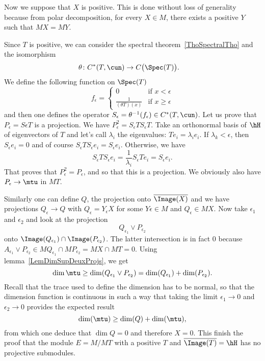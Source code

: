 Now we suppose that $X$ is positive. This is done without loss of generality because from polar decomposition, for every $X\in M$, there exists a positive $Y$ such that $MX=MY$.

Since $T$ is positive, we can consider the spectral theorem~\ref{ThoSpectralTho} and the isomorphism
\begin{equation}
\begin{aligned}
 \theta\colon C^*(T,\cun)&\to C\big( \Spec(T) \big).
\end{aligned}
\end{equation}
We define the following function on $\Spec(T)$
\begin{equation}
	f_{\epsilon}=
			\begin{cases}
					0				&\text{if }x<\epsilon\\
					\frac{ 1 }{ (\theta T)(x) }	&\text{if }x\geq\epsilon
			\end{cases}
\end{equation}
and then one defines the operator $S_{\epsilon}=\theta^{-1}(f_{\epsilon})\in C^*(T,\cun)$. Let us prove that $P_{\epsilon}=S\epsilon T$ is a projection. We have $P_{\epsilon}^2=S_{\epsilon} TS_{\epsilon}T$. Take an orthonormal basis of $\hH$ of eigenvectors of $T$ and let's call $\lambda_i$ the eigenvalues: $Te_i=\lambda_ie_i$. If $\lambda_k<\epsilon$, then $S_{\epsilon}e_i=0$ and of course $S_{\epsilon}TS_{\epsilon}e_i=S_{\epsilon}e_i$. Otherwise, we have
\begin{equation}
	S_{\epsilon}TS_{\epsilon}e_i=\frac{1}{ \lambda_i }S_{\epsilon}T e_i =S_{\epsilon}e_i.
\end{equation}
That proves that $P_{\epsilon}^2=P_{\epsilon}$, and so that this is a projection. We obviously also have $P_{\epsilon}\to \mtu$ in $MT$.

Similarly one can define $Q$, the projection onto $\overline{ \Image(X) }$ and we have projections $Q_{\epsilon}\to Q$ with $Q_{\epsilon}=Y_{\epsilon} X$ for some $Y\epsilon\in M$ and $Q_{\epsilon}\in MX$. Now take $\epsilon_1$ and $\epsilon_2$ and look at the projection
\begin{equation}
	Q_{\epsilon_1}\vee P_{\epsilon_2}
\end{equation}
onto $\Image(Q_{\epsilon_1})\cap\Image(P_{\epsilon_2})$. The latter intersection is in fact $0$ because $A_{\epsilon_1}\vee P_{\epsilon_2}\in MQ_{\epsilon_1}\cap MP_{\epsilon_2}=MX\cap MT=0$. Using lemma~\ref{LemDimSupDeuxProjs}, we get
\begin{equation}
	\dim\mtu\geq \dim(Q_{\epsilon_1}\vee P_{\epsilon_2})=\dim(Q_{\epsilon_1})+\dim(P_{\epsilon_2}).
\end{equation}
Recall that the trace used to define the dimension has to be normal, so that the dimension function is continuous in such a way that taking the limit $\epsilon_1\to 0$ and $\epsilon_2\to 0$ provides the expected result
\begin{equation}
	\dim(\mtu)\geq \dim(Q)+\dim(\mtu),
\end{equation}
from which one deduce that $\dim Q=0$ and therefore $X=0$. This finish the proof that the module $E=M/MT$ with a positive $T$ and $\overline{ \Image(T) }=\hH$ has no projective submodules.

